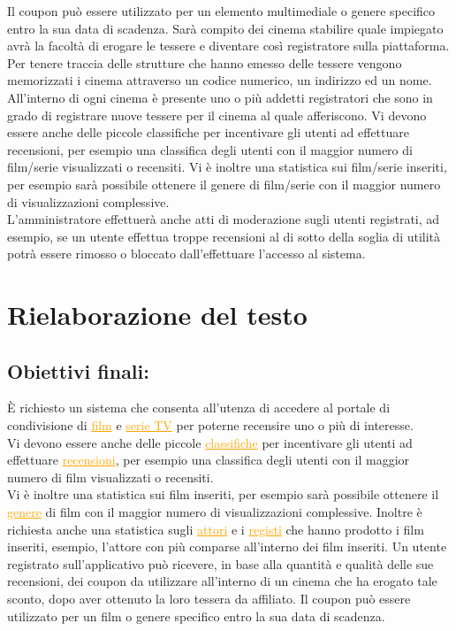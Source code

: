 \documentclass[a4paper,12pt]{report}
\begin{document}
Il coupon può essere utilizzato per un elemento multimediale o genere specifico entro la sua data di scadenza. Sarà compito dei cinema stabilire quale impiegato avrà la facoltà di erogare le tessere e diventare così registratore sulla piattaforma. Per tenere traccia delle strutture che hanno emesso delle tessere vengono memorizzati i cinema attraverso un codice numerico, un indirizzo ed un nome. All'interno di ogni cinema è presente uno o più addetti registratori che sono in grado di registrare nuove tessere per il cinema al quale afferiscono.
Vi devono essere anche delle piccole classifiche per incentivare gli utenti ad effettuare recensioni, per esempio una classifica degli utenti con il maggior numero di film/serie visualizzati o recensiti. Vi è inoltre una statistica sui film/serie inseriti, per esempio sarà possibile ottenere il genere di film/serie con il maggior numero di visualizzazioni complessive. \\ 
L'amministratore effettuerà anche atti di moderazione sugli utenti registrati, ad esempio, se un utente effettua troppe recensioni al di sotto della soglia di utilità potrà essere rimosso o bloccato dall'effettuare l'accesso al sistema.
\section{Rielaborazione del testo}
\subsection{Obiettivi finali:}
È richiesto un sistema che consenta all'utenza di accedere al portale di condivisione di \textcolor{orange}{\underline{film}} e \textcolor{orange}{\underline{serie TV}} per poterne recensire uno o più di interesse.\\
Vi devono essere anche delle piccole \textcolor{orange}{\underline{classifiche}} per incentivare gli utenti ad effettuare \textcolor{orange}{\underline{recensioni}}, per esempio una classifica degli utenti con il maggior numero di film visualizzati o recensiti.\\
Vi è inoltre una statistica sui film inseriti, per esempio sarà possibile ottenere il \textcolor{orange}{\underline{genere}} di film con il maggior numero di visualizzazioni complessive. Inoltre è richiesta anche una statistica sugli \textcolor{orange}{\underline{attori}} e i \textcolor{orange}{\underline{registi}} che hanno prodotto i film inseriti, esempio, l'attore con più comparse all'interno dei film inseriti.
Un utente registrato sull'applicativo può ricevere, in base alla quantità e qualità delle sue recensioni, dei coupon da utilizzare all'interno di un cinema che ha erogato tale sconto, dopo aver ottenuto la loro tessera da affiliato. Il coupon può essere utilizzato per un film o genere specifico entro la sua data di scadenza.
\end{document}

